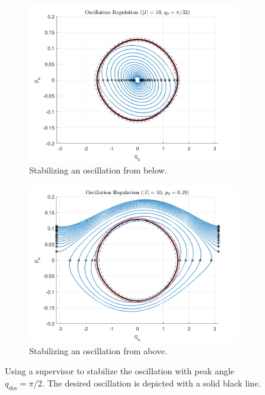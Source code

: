 \documentclass[journal,twoside,web, twocolumn,draftcls]{ieeecolor}
\begin{document}
\begin{figure}
    \centering
    \begin{subfigure}[t]{0.49\linewidth}
        \includegraphics[width=\linewidth]{acrobot_osc_orbit_1.png}
        \caption{Stabilizing an oscillation from below.}
        \label{fig:acrobot-osc-reg-in}
    \end{subfigure}
    \begin{subfigure}[t]{0.49\linewidth}
        \includegraphics[width=\linewidth]{acrobot_osc_orbit_2.png}
        \caption{Stabilizing an oscillation from above.}
        \label{fig:acrobot-osc-reg-diss}
    \end{subfigure}
    \caption{Using a supervisor to stabilize the oscillation with peak angle
    \(q_\text{des} = \pi/2\). The desired oscillation is depicted with a solid
    black line.}
    \label{fig:acrobot-osc-reg}
\end{figure}
\end{document}
